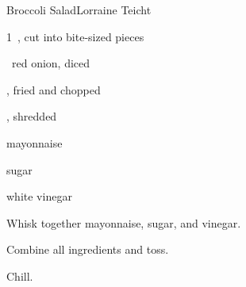 \begin{recipe}{Broccoli Salad}{Lorraine Teicht}{}

\begin{ingredients}
\item 1~, cut into bite-sized pieces
\item \half~red onion, diced
\item \lbs{\half} , fried and chopped
\item \C{\half} , shredded
\item \C{\half} mayonnaise
\item \C{\half} sugar
\item {} white vinegar
\end{ingredients}

\begin{directions}
\item Whisk together mayonnaise, sugar, and vinegar.
\item Combine all ingredients and toss.
\item Chill.
\end{directions}

\end{recipe}
